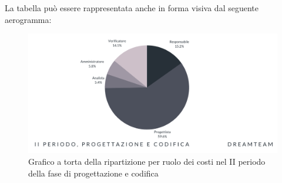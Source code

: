 La tabella può essere rappresentata anche in forma visiva dal seguente aerogramma:

\begin{figure}[!h]
\centering
\includegraphics[scale=0.65]{Sezioni/SezioniPreventivo/grafici/Progettazione_II_periodo_costi.png}
\caption{Grafico a torta della ripartizione per ruolo dei costi nel II periodo della fase di progettazione e codifica}
\end{figure}


